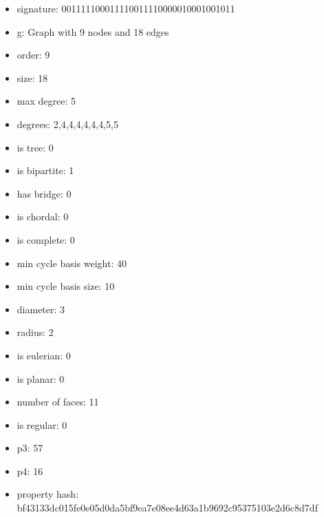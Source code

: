 \newpage
\begin{figure}
\end{figure}
\begin{itemize}
\item signature: 001111100011110011110000010001001011
\item g: Graph with 9 nodes and 18 edges
\item order: 9
\item size: 18
\item max degree: 5
\item degrees: 2,4,4,4,4,4,4,5,5
\item is tree: 0
\item is bipartite: 1
\item has bridge: 0
\item is chordal: 0
\item is complete: 0
\item min cycle basis weight: 40
\item min cycle basis size: 10
\item diameter: 3
\item radius: 2
\item is eulerian: 0
\item is planar: 0
\item number of faces: 11
\item is regular: 0
\item p3: 57
\item p4: 16
\item property hash: bf43133dc015fe0e05d0da5bf9ea7e08ee4d63a1b9692c95375103e2d6c8d7df
\end{itemize}
